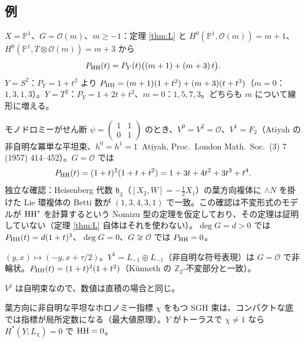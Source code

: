 \subsection{例}\label{sec:examples}
\begin{ex}\tP\tV
$X=\mathbb P^1$、$G=\mathcal O(m)$、$m\ge-1$：定理 \ref{thm:L} と $H^0(\mathbb P^1,\mathcal O(m))=m+1$、$H^0(\mathbb P^1,T\otimes\mathcal O(m))=m+3$ から
\[P_{\mathrm{HH}}(t)=P_Y(t)\bigl((m+1)+(m+3)\,t\bigr).\]
$Y=S^2$：$P_Y=1+t^2$ より $P_{\mathrm{HH}}=(m+1)(1+t^2)+(m+3)(t+t^3)$（$m=0$：$1,3,1,3$）。$Y=T^2$：$P_Y=1+2t+t^2$、$m=0$：$1,5,7,3$。どちらも $m$ について線形に増える。
\end{ex}
\begin{ex}\tP\tV\tQ
モノドロミーがせん断 $\psi=\begin{pmatrix}1&1\\0&1\end{pmatrix}$ のとき、$V^0=V^2=\mathcal O$、$V^1=F_2$（Atiyah の非自明な冪単な平坦束、$h^0=h^1=1$\tC\ Atiyah, Proc.\ London Math.\ Soc.\ (3) 7 (1957) 414--452）。$G=\mathcal O$ では
\[P_{\mathrm{HH}}(t)=(1+t)^2(1+t+t^2)=1+3t+4t^2+3t^3+t^4.\]
独立な確認：Heisenberg 代数 $\mathfrak h_3$（$[X_2,W]=-\tfrac12X_1$）の葉方向複体に $\wedge N$ を掛けた Lie 環複体の Betti 数が $(1,3,4,3,1)$ で一致\tV。この確認は不変形式のモデルが $\mathrm{HH}^*$ を計算するという Nomizu 型の定理を仮定しており、その定理は証明していない\tQ（定理 \ref{thm:L} 自体はそれを使わない）。$\deg G=d>0$ では $P_{\mathrm{HH}}(t)=d(1+t)^3$、$\deg G=0$、$G\not\cong\mathcal O$ では $P_{\mathrm{HH}}=0$。
\end{ex}
\begin{ex}\tP\tV
$(y,x)\mapsto(-y,x+\tau/2)$。$V^1=L_{-1}\oplus L_{-1}$（非自明な符号表現）は $G=\mathcal O$ で非輪状。$P_{\mathrm{HH}}(t)=(1+t)^2(1+t^2)$（Künneth の $\mathbb Z_2$-不変部分と一致）。
\end{ex}
\begin{ex}[ホロノミーが $SO(3)$ の $S^2$-束]\tP
$V^j$ は自明束なので、数値は直積の場合と同じ。
\end{ex}
\begin{rem}
葉方向に非自明な平坦なホロノミー指標 $\chi$ をもつ SGH 束は、コンパクトな底では指標が局所定数になる（最大値原理）。$Y$ がトーラスで $\chi\neq1$ なら $H^*(Y;L_\chi)=0$ で $\mathrm{HH}=0$。\tP
\end{rem}

